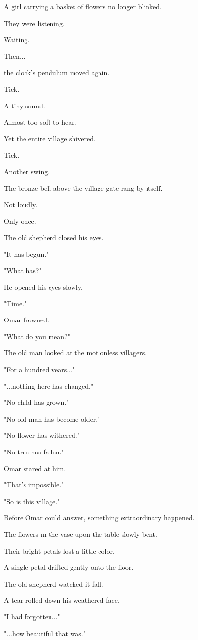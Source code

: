 \documentclass[12pt,openany]{book}
\begin{document}
A girl carrying a basket of flowers no longer blinked.

They were listening.

Waiting.

Then...

the clock's pendulum moved again.

Tick.

A tiny sound.

Almost too soft to hear.

Yet the entire village shivered.

Tick.

Another swing.

The bronze bell above the village gate rang by itself.

Not loudly.

Only once.

The old shepherd closed his eyes.

"It has begun."

"What has?"

He opened his eyes slowly.

"Time."

Omar frowned.

"What do you mean?"

The old man looked at the motionless villagers.

"For a hundred years..."

"...nothing here has changed."

"No child has grown."

"No old man has become older."

"No flower has withered."

"No tree has fallen."

Omar stared at him.

"That's impossible."

"So is this village."

Before Omar could answer, something extraordinary happened.

The flowers in the vase upon the table slowly bent.

Their bright petals lost a little color.

A single petal drifted gently onto the floor.

The old shepherd watched it fall.

A tear rolled down his weathered face.

"I had forgotten..."

"...how beautiful that was."
\end{document}
